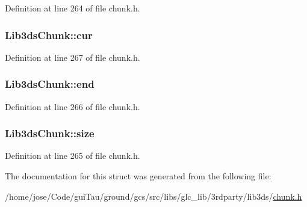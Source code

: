 Definition at line 264 of file chunk.\-h.

\hypertarget{struct_lib3ds_chunk_a7d3fcb3881c4356de7370e2fb252100e}{
\subsubsection[{cur}]{ Lib3ds\-Chunk\-::cur}}\label{struct_lib3ds_chunk_a7d3fcb3881c4356de7370e2fb252100e}


Definition at line 267 of file chunk.\-h.

\hypertarget{struct_lib3ds_chunk_a9c09407d6b39d44cdac9e9ed0d6653f6}{
\subsubsection[{end}]{ Lib3ds\-Chunk\-::end}}\label{struct_lib3ds_chunk_a9c09407d6b39d44cdac9e9ed0d6653f6}


Definition at line 266 of file chunk.\-h.

\hypertarget{struct_lib3ds_chunk_a76b6997253974515537be96154e42dec}{
\subsubsection[{size}]{ Lib3ds\-Chunk\-::size}}\label{struct_lib3ds_chunk_a76b6997253974515537be96154e42dec}


Definition at line 265 of file chunk.\-h.



The documentation for this struct was generated from the following file\-:\begin{DoxyCompactItemize}
\item 
/home/jose/\-Code/gui\-Tau/ground/gcs/src/libs/glc\-\_\-lib/3rdparty/lib3ds/\hyperlink{chunk_8h}{chunk.\-h}\end{DoxyCompactItemize}
